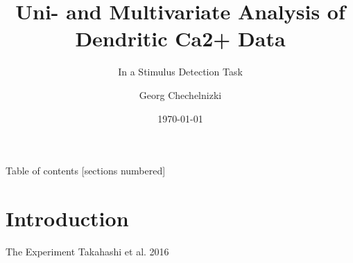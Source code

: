 \documentclass[10pt]{beamer}
\title{Uni- and Multivariate Analysis of Dendritic Ca2+ Data}
\subtitle{In a Stimulus Detection Task}
\date{\today}
\author{Georg Chechelnizki}
\institute{BCCN Berlin}
\begin{document}
\maketitle

\begin{frame}{Table of contents}
  [sections numbered]
  \tableofcontents[hideallsubsections]
\end{frame}

\section{Introduction}

\begin{frame}[fragile]{The Experiment}
Takahashi et al. 2016	
\begin{columns}[T,onlytextwidth]
      

\end{columns}
\end{frame}
\end{document}

